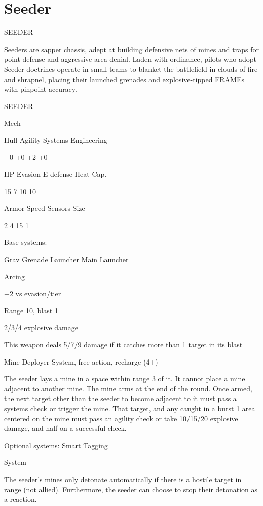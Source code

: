 \section{Seeder}

                                                SEEDER

Seeders are sapper chassis, adept at building defensive nets of mines and traps for point defense
and aggressive area denial. Laden with ordinance, pilots who adopt Seeder doctrines operate in
small teams to blanket the battlefield in clouds of fire and shrapnel, placing their launched
grenades and explosive-tipped FRAMEs with pinpoint accuracy.


 SEEDER

 Mech

 Hull       Agility      Systems       Engineering

 +0         +0           +2            +0

 HP         Evasion      E-defense     Heat Cap.

 15         7            10            10

 Armor      Speed        Sensors       Size

 2          4            15            1

Base systems:

Grav Grenade Launcher
Main Launcher

Arcing

+2 vs evasion/tier

Range 10, blast 1

2/3/4 explosive damage

This weapon deals 5/7/9 damage if it catches more than 1 target in its blast


Mine Deployer
System, free action, recharge (4+)

The seeder lays a mine in a space within range 3 of it. It cannot place a mine adjacent to another
mine. The mine arms at the end of the round. Once armed, the next target other than the seeder
to become adjacent to it must pass a systems check or trigger the mine. That target, and any
caught in a burst 1 area centered on the mine must pass an agility check or take 10/15/20
explosive damage, and half on a successful check.


Optional systems:
Smart Tagging

System

The seeder’s mines only detonate automatically if there is a hostile target in range (not allied).
Furthermore, the seeder can choose to stop their detonation as a reaction.





